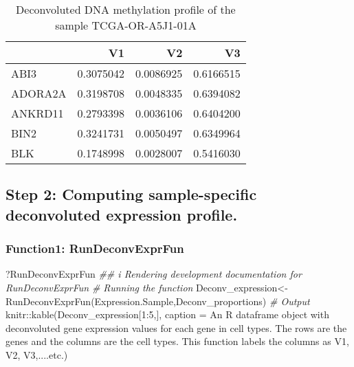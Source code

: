 \documentclass[]{article}
\newcommand{\hlnum}[1]{\textcolor[rgb]{0.816,0.125,0.439}{#1}}%
\newcommand{\hlstr}[1]{\textcolor[rgb]{0.251,0.627,0.251}{#1}}%
\newcommand{\hlcom}[1]{\textcolor[rgb]{0.502,0.502,0.502}{\textit{#1}}}%
\newcommand{\hlstd}[1]{\textcolor[rgb]{0.251,0.251,0.251}{#1}}%
\newenvironment{Shaded}{\begin{myshaded}}{\end{myshaded}}
\newcommand{\DecValTok}[1]{\hlnum{#1}}
\newcommand{\SpecialCharTok}[1]{\hlstr{#1}}
\newcommand{\StringTok}[1]{\hlstr{#1}}
\newcommand{\CommentTok}[1]{\hlcom{#1}}
\newcommand{\DocumentationTok}[1]{\hlcom{#1}}
\newcommand{\OtherTok}[1]{{#1}}
\newcommand{\FunctionTok}[1]{\hlstd{#1}}
\newcommand{\AttributeTok}[1]{{#1}}
\newcommand{\NormalTok}[1]{\hlstd{#1}}
\begin{document}
\begin{table}

\caption{\label{tab:unnamed-chunk-75}Deconvoluted DNA methylation profile of the sample TCGA-OR-A5J1-01A}
\centering
\begin{tabular}[t]{l|r|r|r}
\hline
  & V1 & V2 & V3\\
\hline
ABI3 & 0.3075042 & 0.0086925 & 0.6166515\\
\hline
ADORA2A & 0.3198708 & 0.0048335 & 0.6394082\\
\hline
ANKRD11 & 0.2793398 & 0.0036106 & 0.6404200\\
\hline
BIN2 & 0.3241731 & 0.0050497 & 0.6349964\\
\hline
BLK & 0.1748998 & 0.0028007 & 0.5416030\\
\hline
\end{tabular}
\end{table}

\hypertarget{step-2-computing-sample-specific-deconvoluted-expression-profile.}{%
\subsection{\texorpdfstring{ Step 2: Computing sample-specific deconvoluted expression profile.}{  Step 2: Computing sample-specific deconvoluted expression profile.}}\label{step-2-computing-sample-specific-deconvoluted-expression-profile.}}

\hypertarget{function1-rundeconvexprfun}{%
\subsubsection{\texorpdfstring{ Function1: RunDeconvExprFun}{  Function1: RunDeconvExprFun}}\label{function1-rundeconvexprfun}}

\begin{Shaded}
\begin{Highlighting}[]
\NormalTok{?RunDeconvExprFun}
\DocumentationTok{\#\# i Rendering development documentation for \textquotesingle{}RunDeconvExprFun\textquotesingle{}}
\CommentTok{\# Running the function}
\NormalTok{Deconv\_expression}\OtherTok{\textless{}{-}}\FunctionTok{RunDeconvExprFun}\NormalTok{(Expression.Sample,Deconv\_proportions)}
\CommentTok{\# Output}
\NormalTok{knitr}\SpecialCharTok{::}\FunctionTok{kable}\NormalTok{(Deconv\_expression[}\DecValTok{1}\SpecialCharTok{:}\DecValTok{5}\NormalTok{,], }\AttributeTok{caption =} \StringTok{\textquotesingle{}An R dataframe object with deconvoluted gene expression values for each gene in cell types. The rows are the genes and the columns are the cell types. This function labels the columns as V1, V2, V3,....etc.\textquotesingle{}}\NormalTok{)}
\end{Highlighting}
\end{Shaded}
\end{document}
